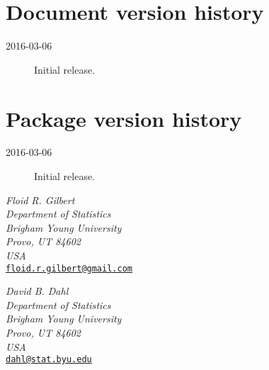 \documentclass[
article,
11pt, %
a4paper, %
oneside, %
headinclude,footinclude, %
]{scrartcl}
\theoremstyle{definition} %
\theoremstyle{plain} %
\theoremstyle{remark} %
\newcommand{\address}[1]{\addvspace{\baselineskip}\noindent\emph{#1}}
\newcommand{\email}[1]{\href{mailto:#1}{\normalfont\texttt{#1}}}
\begin{document}
\section{Document version history}

\begin{description}
\item[2016-03-06] Initial release.
\end{description}

\section{Package version history}

\begin{description}
\item[2016-03-06] Initial release.
\end{description}

\renewcommand{\refname}{References} %



\nocite{*}

\address{Floid R. Gilbert\\
    Department of Statistics\\
    Brigham Young University\\
    Provo, UT 84602\\
    USA\\}
\email{floid.r.gilbert@gmail.com}

\address{David B. Dahl\\
    Department of Statistics\\
    Brigham Young University\\
    Provo, UT 84602\\
    USA\\}
\email{dahl@stat.byu.edu}
\end{document}
